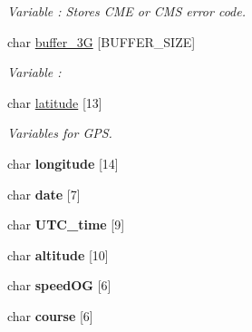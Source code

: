 \begin{DoxyCompactItemize}
\begin{DoxyCompactList}\small\item\em Variable \+: Stores C\+ME or C\+MS error code. \end{DoxyCompactList}\item 
char \hyperlink{class_wasp3_g_a9cc8207bd8996076646ceef4a60f7f30}{buffer\+\_\+3G} \mbox{[}B\+U\+F\+F\+E\+R\+\_\+\+S\+I\+ZE\mbox{]}\hypertarget{class_wasp3_g_a9cc8207bd8996076646ceef4a60f7f30}{}\label{class_wasp3_g_a9cc8207bd8996076646ceef4a60f7f30}

\begin{DoxyCompactList}\small\item\em Variable \+: \end{DoxyCompactList}\item 
char \hyperlink{class_wasp3_g_a4f8f9b6284c79f4e625c68b6b1cb826f}{latitude} \mbox{[}13\mbox{]}\hypertarget{class_wasp3_g_a4f8f9b6284c79f4e625c68b6b1cb826f}{}\label{class_wasp3_g_a4f8f9b6284c79f4e625c68b6b1cb826f}

\begin{DoxyCompactList}\small\item\em Variables for G\+PS. \end{DoxyCompactList}\item 
char {\bfseries longitude} \mbox{[}14\mbox{]}\hypertarget{class_wasp3_g_a881b4ecef5323f3482727cb297741970}{}\label{class_wasp3_g_a881b4ecef5323f3482727cb297741970}

\item 
char {\bfseries date} \mbox{[}7\mbox{]}\hypertarget{class_wasp3_g_a071a7c9c710bb467a1c305e01d8d173f}{}\label{class_wasp3_g_a071a7c9c710bb467a1c305e01d8d173f}

\item 
char {\bfseries U\+T\+C\+\_\+time} \mbox{[}9\mbox{]}\hypertarget{class_wasp3_g_ad131ac5c0be338efb5e31c50455c88b7}{}\label{class_wasp3_g_ad131ac5c0be338efb5e31c50455c88b7}

\item 
char {\bfseries altitude} \mbox{[}10\mbox{]}\hypertarget{class_wasp3_g_abf22ea5e55fd8e7ef2fa88c4c1e01c4f}{}\label{class_wasp3_g_abf22ea5e55fd8e7ef2fa88c4c1e01c4f}

\item 
char {\bfseries speed\+OG} \mbox{[}6\mbox{]}\hypertarget{class_wasp3_g_a09f5d9677a71aa57a588fa725ef0cd10}{}\label{class_wasp3_g_a09f5d9677a71aa57a588fa725ef0cd10}

\item 
char {\bfseries course} \mbox{[}6\mbox{]}\hypertarget{class_wasp3_g_aae91613c0bf15d0d3674b4e0ab4a4ac0}{}\label{class_wasp3_g_aae91613c0bf15d0d3674b4e0ab4a4ac0}

\end{DoxyCompactItemize}


